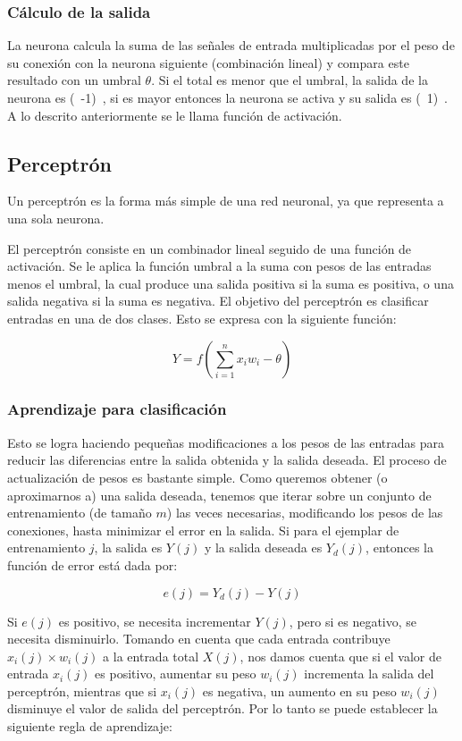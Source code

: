 \subsubsection{Cálculo de la salida}

\noindent La neurona calcula la suma de las señales de entrada multiplicadas por el peso de su conexión con la neurona siguiente (combinación lineal) y compara este resultado con un umbral $\theta$. Si el total es menor que el umbral, la salida de la neurona es (\ -1)\ , si es mayor entonces la neurona se activa y su salida es (\ 1)\ . A lo descrito anteriormente se le llama función de activación.


\subsection{Perceptr\'on}

Un perceptrón es la forma más simple de una red neuronal, ya que representa a una sola neurona.

El perceptrón consiste en un combinador lineal seguido de una función de activación. Se le aplica la función umbral a la suma con pesos de las entradas menos el umbral, la cual produce una salida positiva si la suma es positiva, o una salida negativa si la suma es negativa. El objetivo del perceptrón es clasificar entradas en una de dos clases. Esto se expresa con la siguiente función: 

\[Y = f\left(\sum_{i=1}^{n}x_iw_i-\theta\right)\]
\parencite[169]{Nengnevitsky2005}

\subsubsection{Aprendizaje para clasificación}

Esto se logra haciendo pequeñas modificaciones a los pesos de las entradas para reducir las diferencias entre la salida obtenida y la salida deseada. El proceso de actualización de pesos es bastante simple. Como queremos obtener (o aproximarnos a) una salida deseada, tenemos que iterar sobre un conjunto de entrenamiento (de tamaño $m$) las veces necesarias, modificando los pesos de las conexiones, hasta minimizar el error en la salida. Si para el ejemplar de entrenamiento $j$, la salida es $Y(j)$ y la salida deseada es $Y_d(j)$, entonces la función de error está dada por:

\[ e(j) = Y_d(j)-Y(j)\]
\parencite[171]{Nengnevitsky2005}

Si $e(j)$ es positivo, se necesita incrementar $Y(j)$, pero si es negativo, se necesita disminuirlo. Tomando en cuenta que cada entrada contribuye \(x_i(j) \times w_i(j)\) a la entrada total $X(j)$, nos damos cuenta que si el valor de entrada $x_i(j)$ es positivo, aumentar su peso $w_i(j)$ incrementa la salida del perceptrón, mientras que si $x_i(j)$ es negativa, un aumento en su peso $w_i(j)$ disminuye el valor de salida del perceptrón. Por lo tanto se puede establecer la siguiente regla de aprendizaje:


